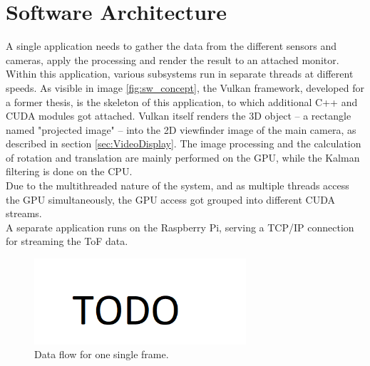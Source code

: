\section{Software Architecture}
\label{sec:Software}
A single application needs to gather the data from the different sensors and cameras, apply the processing and render the result to an attached monitor. Within this application, various subsystems run in separate threads at different speeds. As visible in image \ref{fig:sw_concept}, the Vulkan framework, developed for a former thesis, is the skeleton of this application, to which additional C++ and CUDA modules got attached. Vulkan itself renders the 3D object – a rectangle named "projected image" – into the 2D viewfinder image of the main camera, as described in section \ref{sec:VideoDisplay}. The image processing and the calculation of rotation and translation are mainly performed on the GPU, while the Kalman filtering is done on the CPU.\\
Due to the multithreaded nature of the system, and as multiple threads access the GPU simultaneously, the GPU access got grouped into different CUDA streams. \\
A separate application runs on the Raspberry Pi, serving a TCP/IP connection for streaming the ToF data. 
\begin{figure}[H]
    \centering
    \includegraphics[width=0.7\textwidth]{images/todo.png}
    \caption{Data flow for one single frame.}
    \label{im:DataFlow}
\end{figure}

